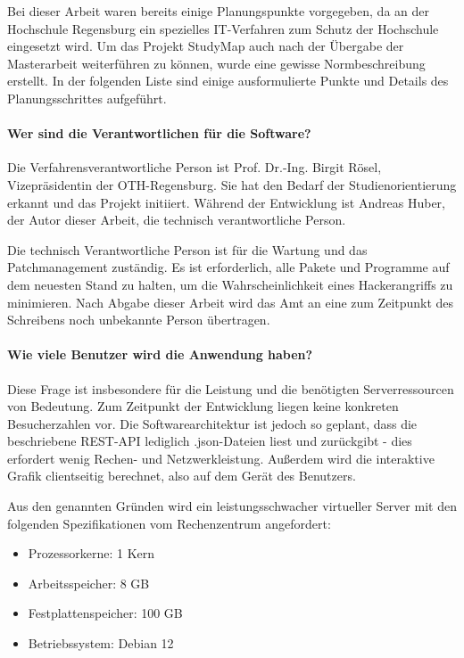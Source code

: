 Bei dieser Arbeit waren bereits einige Planungspunkte vorgegeben, da an der Hochschule Regensburg ein spezielles IT-Verfahren zum Schutz der Hochschule eingesetzt wird. Um das Projekt StudyMap auch nach der Übergabe der Masterarbeit weiterführen zu können, wurde eine gewisse Normbeschreibung erstellt. In der folgenden Liste sind einige ausformulierte Punkte und Details des Planungsschrittes aufgeführt.

\paragraph*{Wer sind die Verantwortlichen für die Software?}
Die Verfahrensverantwortliche Person ist Prof. Dr.-Ing. Birgit Rösel, Vizepräsidentin der OTH-Regensburg. Sie hat den Bedarf der Studienorientierung erkannt und das Projekt initiiert. Während der Entwicklung ist Andreas Huber, der Autor dieser Arbeit, die technisch verantwortliche Person.

Die technisch Verantwortliche Person ist für die Wartung und das Patchmanagement zuständig. Es ist erforderlich, alle Pakete und Programme auf dem neuesten Stand zu halten, um die Wahrscheinlichkeit eines Hackerangriffs zu minimieren. Nach Abgabe dieser Arbeit wird das Amt an eine zum Zeitpunkt des Schreibens noch unbekannte Person übertragen.

\paragraph*{Wie viele Benutzer wird die Anwendung haben?}
Diese Frage ist insbesondere für die Leistung und die benötigten Serverressourcen von Bedeutung. Zum Zeitpunkt der Entwicklung liegen keine konkreten Besucherzahlen vor. Die Softwarearchitektur ist jedoch so geplant, dass die beschriebene REST-API lediglich .json-Dateien liest und zurückgibt - dies erfordert wenig Rechen- und Netzwerkleistung. Außerdem wird die interaktive Grafik clientseitig berechnet, also auf dem Gerät des Benutzers.

Aus den genannten Gründen wird ein leistungsschwacher virtueller Server mit den folgenden Spezifikationen vom Rechenzentrum angefordert:
\begin{itemize}
    \item Prozessorkerne: 1 Kern
    \item Arbeitsspeicher: 8 GB
    \item Festplattenspeicher: 100 GB
    \item Betriebssystem: Debian 12
\end{itemize}

